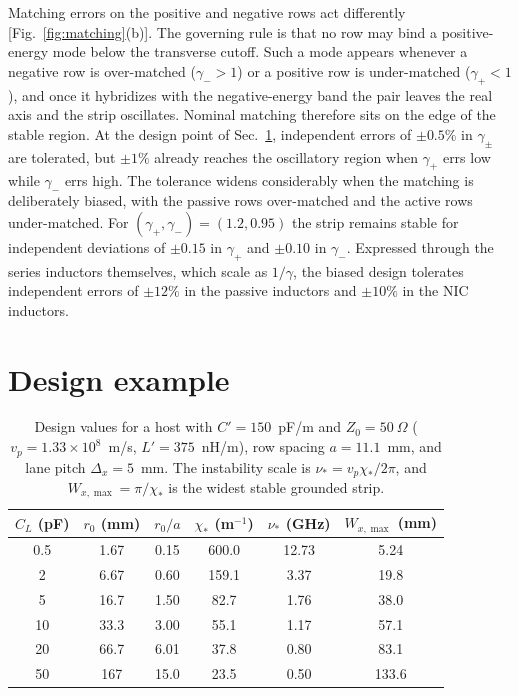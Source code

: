 \documentclass[aps,prapplied,twocolumn,superscriptaddress,floatfix,longbibliography]{revtex4-2}
\begin{document}
Matching errors on the positive and negative rows act differently [Fig.~\ref{fig:matching}(b)]. The governing rule is that no row may bind a positive-energy mode below the transverse cutoff. Such a mode appears whenever a negative row is over-matched ($\gamma_->1$) or a positive row is under-matched ($\gamma_+<1$), and once it hybridizes with the negative-energy band the pair leaves the real axis and the strip oscillates. Nominal matching therefore sits on the edge of the stable region. At the design point of Sec.~\ref{sec:hardware}, independent errors of $\pm0.5\%$ in $\gamma_\pm$ are tolerated, but $\pm1\%$ already reaches the oscillatory region when $\gamma_+$ errs low while $\gamma_-$ errs high. The tolerance widens considerably when the matching is deliberately biased, with the passive rows over-matched and the active rows under-matched. For $(\gamma_+,\gamma_-)=(1.2,0.95)$ the strip remains stable for independent deviations of $\pm0.15$ in $\gamma_+$ and $\pm0.10$ in $\gamma_-$. Expressed through the series inductors themselves, which scale as $1/\gamma$, the biased design tolerates independent errors of $\pm12\%$ in the passive inductors and $\pm10\%$ in the NIC inductors.

\section{Design example}
\label{sec:hardware}

\begin{table}[t]
\caption{Design values for a host with $C'=150$~pF/m and $Z_0=50~\Omega$ ($v_p=1.33\times10^8$~m/s, $L'=375$~nH/m), row spacing $a=11.1$~mm, and lane pitch $\Delta_x=5$~mm. The instability scale is $\nu_*=v_p\chi_*/2\pi$, and $W_{x,\max}=\pi/\chi_*$ is the widest stable grounded strip.}
\label{tab:hardware}
\begin{ruledtabular}
\begin{tabular}{cccccc}
$C_L$ (pF) & $r_0$ (mm) & $r_0/a$ & $\chi_*$ (m$^{-1}$) & $\nu_*$ (GHz) & $W_{x,\max}$ (mm) \\ \hline
0.5 & 1.67 & 0.15 & 600.0 & 12.73 & 5.24 \\
2   & 6.67 & 0.60 & 159.1 & 3.37 & 19.8 \\
5   & 16.7 & 1.50 & 82.7 & 1.76 & 38.0 \\
10  & 33.3 & 3.00 & 55.1 & 1.17 & 57.1 \\
20  & 66.7 & 6.01 & 37.8 & 0.80 & 83.1 \\
50  & 167  & 15.0 & 23.5 & 0.50 & 133.6 \\
\end{tabular}
\end{ruledtabular}
\end{table}
\end{document}
